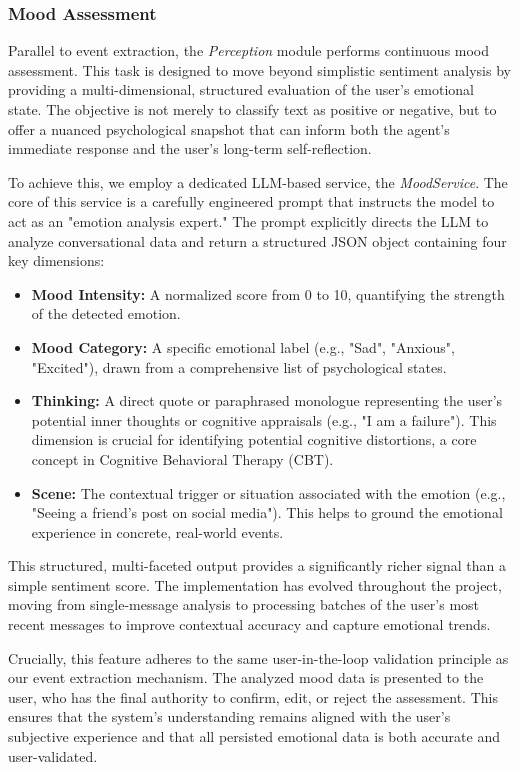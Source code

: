 \subsubsection{Mood Assessment}
\label{subsubsec:mood_assessment}

Parallel to event extraction, the \textit{Perception} module performs continuous mood assessment. This task is designed to move beyond simplistic sentiment analysis by providing a multi-dimensional, structured evaluation of the user's emotional state. The objective is not merely to classify text as positive or negative, but to offer a nuanced psychological snapshot that can inform both the agent's immediate response and the user's long-term self-reflection.

To achieve this, we employ a dedicated LLM-based service, the \textit{MoodService}. The core of this service is a carefully engineered prompt that instructs the model to act as an "emotion analysis expert." The prompt explicitly directs the LLM to analyze conversational data and return a structured JSON object containing four key dimensions:

\begin{itemize}
    \item \textbf{Mood Intensity:} A normalized score from 0 to 10, quantifying the strength of the detected emotion.
    \item \textbf{Mood Category:} A specific emotional label (e.g., "Sad", "Anxious", "Excited"), drawn from a comprehensive list of psychological states.
    \item \textbf{Thinking:} A direct quote or paraphrased monologue representing the user's potential inner thoughts or cognitive appraisals (e.g., "I am a failure"). This dimension is crucial for identifying potential cognitive distortions, a core concept in Cognitive Behavioral Therapy (CBT).
    \item \textbf{Scene:} The contextual trigger or situation associated with the emotion (e.g., "Seeing a friend's post on social media"). This helps to ground the emotional experience in concrete, real-world events.
\end{itemize}

This structured, multi-faceted output provides a significantly richer signal than a simple sentiment score. The implementation has evolved throughout the project, moving from single-message analysis to processing batches of the user's most recent messages to improve contextual accuracy and capture emotional trends.

Crucially, this feature adheres to the same user-in-the-loop validation principle as our event extraction mechanism. The analyzed mood data is presented to the user, who has the final authority to confirm, edit, or reject the assessment. This ensures that the system's understanding remains aligned with the user's subjective experience and that all persisted emotional data is both accurate and user-validated. 